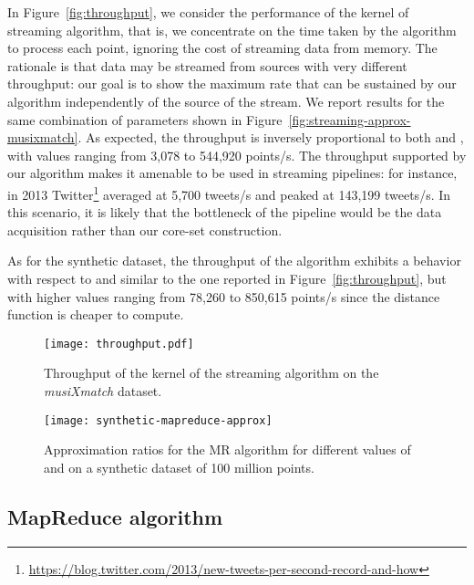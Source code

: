 \documentclass{article}
\begin{document}
In Figure~\ref{fig:throughput}, we consider the performance of the
kernel of streaming algorithm, that is, we concentrate on the time
taken by the algorithm to process each point, ignoring the cost of
streaming data from memory. The rationale is that data may be streamed
from sources with very different throughput: our goal is to show the
maximum rate that can be sustained by our algorithm independently of
the source of the stream.  We report results for the same combination
of parameters shown in Figure~\ref{fig:streaming-approx-musixmatch}.
As expected, the throughput is inversely proportional to both  and
, with values ranging from 3,078 to 544,920 points/s.  The
throughput supported by our algorithm makes it amenable to be used in
streaming pipelines: for instance, in 2013
Twitter\footnote{\url{https://blog.twitter.com/2013/new-tweets-per-second-record-and-how}}
averaged at 5,700 tweets/s and peaked at 143,199 tweets/s.  In this
scenario, it is likely that the bottleneck of the pipeline would be
the data acquisition rather than our core-set construction.

As for the synthetic dataset, the throughput of the algorithm exhibits
a behavior with respect to  and  similar to the one reported in
Figure~\ref{fig:throughput}, but with higher values ranging from
78,260 to 850,615 points/s since the distance function is cheaper to compute.

\begin{figure}[t]
  \begin{minipage}{.49\linewidth}
    \centering
    \texttt{[image: throughput.pdf]}
    \caption{Throughput of the kernel of the streaming algorithm on the \emph{musiXmatch} dataset.}
    \label{fig:throughput}
  \end{minipage}
  \hfill
  \begin{minipage}{.49\linewidth}
    \centering
    \texttt{[image: synthetic-mapreduce-approx]}
    \caption{Approximation ratios for the MR algorithm for different values of  and  on a synthetic dataset of 100 million points.}\label{fig:mapreduce-approximation}
  \end{minipage}
\end{figure}


\subsection{MapReduce algorithm} \label{subsec:MRexp}
\end{document}

